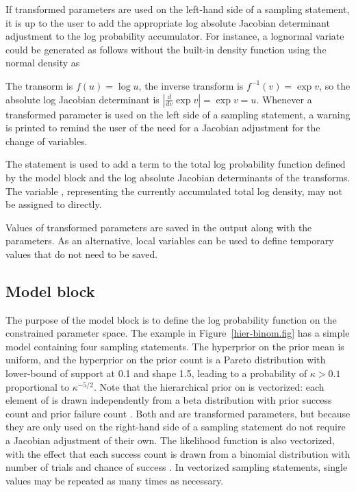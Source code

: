 \documentclass[article]{jss}
\begin{document}
If transformed parameters are used on the left-hand side of a sampling
statement, it is up to the user to add the appropriate log absolute
Jacobian determinant adjustment to the log probability accumulator.
For instance, a lognormal variate could be generated as follows
without the built-in  density function using the
normal density as
%
\begin{Code}
parameters {
  real<lower=0> u;
  ...
transformed parameters {
  real v;
  v <- log(u);
  // log absolute Jacobian determinant adjustment
  increment_log_prob(u);      
}
model {
  v ~ normal(0,1);
}
\end{Code}
%
The transorm is $f(u) = \log u$, the inverse transform is $f^{-1}(v) =
\exp v$, so the absolute log Jacobian determinant is $|\frac{d}{dv}
\exp v| = \exp v = u$.  Whenever a transformed parameter is used on
the left side of a sampling statement, a warning is printed to remind
the user of the need for a Jacobian adjustment for the change of
variables.

The  statement is used to add a term to the
total log probability function defined by the model block and the log
absolute Jacobian determinants of the transforms.  The variable
, representing the currently accumulated total log
density, may not be assigned to directly.


Values of transformed parameters are saved in the output along
with the parameters.  As an alternative, local variables can be used
to define temporary values that do not need to be saved.  

\subsection{Model block}

The purpose of the model block is to define the log probability
function on the constrained parameter space.  The example in
Figure~\ref{hier-binom.fig} has a simple model containing four
sampling statements.  The hyperprior on the prior mean 
is uniform, and the hyperprior on the prior count  is a
Pareto distribution with lower-bound of support at 0.1 and shape 1.5,
leading to a probability of $\kappa > 0.1$ proportional to
$\kappa^{-5/2}$.  Note that the hierarchical prior on  is
vectorized: each element of  is drawn independently from a
beta distribution with prior success count  and prior
failure count .  Both  and  are
transformed parameters, but because they are only used on the
right-hand side of a sampling statement do not require a Jacobian
adjustment of their own.  The likelihood function is also vectorized,
with the effect that each success count  is drawn from a
binomial distribution with number of trials  and chance of
success .  In vectorized sampling statements, single
values may be repeated as many times as necessary.
\end{document}
